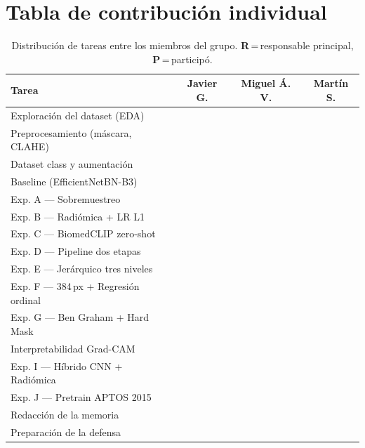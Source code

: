 \documentclass[12pt, a4paper]{article}
\begin{document}
\section{Tabla de contribución individual}
\label{sec:contribucion}

\begin{table}[H]
  \centering
  \caption{Distribución de tareas entre los miembros del grupo.
    \textbf{R}\,=\,responsable principal, \textbf{P}\,=\,participó.}
  \label{tab:contribucion}
  \begin{tabularx}{\textwidth}{X c c c}
    \toprule
    \rowcolor{azuloscuro!15}
    \textbf{Tarea} &
    \textbf{\small Javier G.} &
    \textbf{\small Miguel Á. V.} &
    \textbf{\small Martín S.} \\
    \midrule
    Exploración del dataset (EDA)           & & & \\
    \rowcolor{grisclaro}
    Preprocesamiento (máscara, CLAHE)       & & & \\
    Dataset class y aumentación             & & & \\
    \rowcolor{grisclaro}
    Baseline (EfficientNetBN-B3)            & & & \\
    Exp. A --- Sobremuestreo                & & & \\
    \rowcolor{grisclaro}
    Exp. B --- Radiómica + LR L1            & & & \\
    Exp. C --- BiomedCLIP zero-shot         & & & \\
    \rowcolor{grisclaro}
    Exp. D --- Pipeline dos etapas          & & & \\
    Exp. E --- Jerárquico tres niveles      & & & \\
    \rowcolor{grisclaro}
    Exp. F --- 384\,px + Regresión ordinal  & & & \\
    Exp. G --- Ben Graham + Hard Mask       & & & \\
    \rowcolor{grisclaro}
    Interpretabilidad Grad-CAM             & & & \\
    Exp. I --- Híbrido CNN + Radiómica      & & & \\
    \rowcolor{grisclaro}
    Exp. J --- Pretrain APTOS 2015          & & & \\
    Redacción de la memoria                 & & & \\
    \rowcolor{grisclaro}
    Preparación de la defensa               & & & \\
    \bottomrule
  \end{tabularx}
\end{table}
\end{document}
